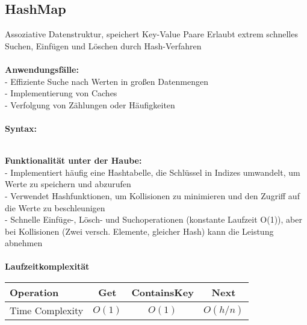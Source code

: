 \documentclass[../main.tex]{subfiles}
\begin{document}
	\subsection{HashMap}
	Assoziative Datenstruktur, speichert Key-Value Paare
	Erlaubt extrem schnelles Suchen, Einfügen und Löschen durch Hash-Verfahren\\\\
	\textbf{Anwendungsfälle:}\\
	- Effiziente Suche nach Werten in großen Datenmengen\\
	- Implementierung von Caches\\
	- Verfolgung von Zählungen oder Häufigkeiten\\\\
	\textbf{Syntax:}
	 
	\\
	\textbf{Funktionalität unter der Haube:}\\
	- Implementiert häufig eine Hashtabelle, die Schlüssel in Indizes umwandelt, um Werte zu speichern und abzurufen\\
	- Verwendet Hashfunktionen, um Kollisionen zu minimieren und den Zugriff auf die Werte zu beschleunigen\\
	- Schnelle Einfüge-, Lösch- und Suchoperationen (konstante Laufzeit O(1)), aber bei Kollisionen (Zwei versch. Elemente, gleicher Hash) kann die Leistung abnehmen\\\\
	\textbf{Laufzeitkomplexität}\\
	\begin{table}[ht]
		\centering
		\begin{tabular}{l *{3}{c}}
			\toprule
			Operation & Get & ContainsKey & Next\\
			\midrule
			Time Complexity & $O(1)$ & $O(1)$ & $O(h / n)$\\
			\bottomrule
		\end{tabular}
	\end{table}
	\clearpage
	
\end{document}
